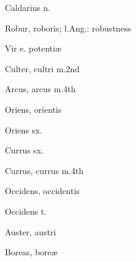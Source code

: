  {\mktsStyleItalic{}Caldarius\/} {\mktsStyleItalic{}n.\/}


 {\mktsStyleItalic{}Robur\/}, roboris; l.Ang.: robustness


 {\mktsStyleItalic{}Vir e. potentiæ\/}


 {\mktsStyleItalic{}Culter\/}, cultri {\mktsStyleItalic{}m.2nd\/}


 {\mktsStyleItalic{}Arcus\/}, arcus {\mktsStyleItalic{}m.4th\/}


  {}


 {\mktsStyleItalic{}Oriens\/}, orientis


 {\mktsStyleItalic{}Oriens sx.\/}


 {\mktsStyleItalic{}Currus sx.\/}


 {\mktsStyleItalic{}Currus\/}, currus {\mktsStyleItalic{}m.4th\/}


 {\mktsStyleItalic{}Occidens\/}, occidentis


 {\mktsStyleItalic{}Occidens t.\/}


 {\mktsStyleItalic{}Auster\/}, austri


 {\mktsStyleItalic{}Boreas\/}, boreæ


